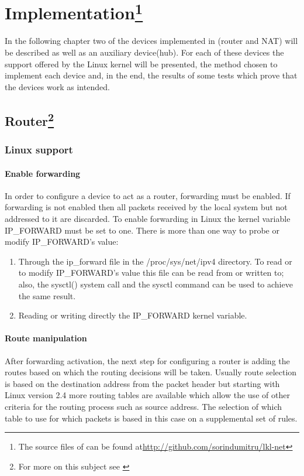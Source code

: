 \chapter[Implementation]{Implementation\footnote{The source files of \project can be found at\url{http://github.com/sorindumitru/lkl-net}}}
\label{chapter:impl}
In the following chapter two of the devices implemented in \project(router and NAT) will be described 
as well as an auxiliary device(hub). For each of these devices the support offered by the 
Linux kernel will be presented, the method chosen to implement each device and, in the end, the results 
of some tests which prove that the devices work as intended.

\section[Router]{Router\footnote{For more on this subject see \cite{linnetarch}}}
\label{sec:router-impl}

\subsection{Linux support}
\label{sub-sec:router-linux}

\subsubsection{Enable forwarding}
In order to configure a device to act as a router, forwarding must be enabled. If forwarding is not enabled 
then all packets received by the local system but not addressed to it are discarded.  To enable forwarding in Linux the 
kernel variable IP_FORWARD must be set to one. There is more than one way to probe or modify IP_FORWARD's value:
\renewcommand{\theenumi}{\alph{enumi}}
\begin{enumerate}
\item Through the ip_forward file in the /proc/sys/net/ipv4 directory. To read or to modify IP_FORWARD's value this file can be read from or written to; also, the sysctl() system call and the sysctl command can be used to achieve the same result. 
\item Reading or writing directly the IP_FORWARD kernel variable. 
\end{enumerate}
\renewcommand{\theenumi}{\arabic{enumi}}

\subsubsection{Route manipulation}
After forwarding activation, the next step for configuring a router is adding the routes based on which 
the routing decisions will be taken. Usually route selection is based on the destination address from the 
packet header but starting with Linux version 2.4 more routing tables are available which allow the use of 
other criteria for the routing process such as source address. The selection of which table to use for which 
packets is based in this case on a supplemental set of rules.

